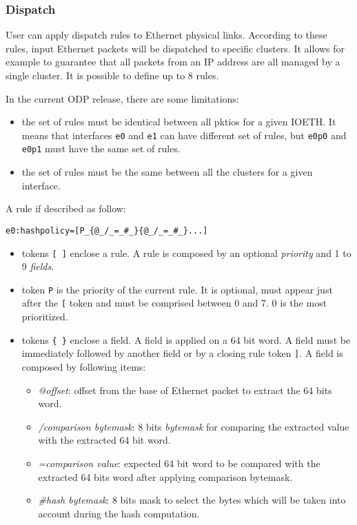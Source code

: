 \documentclass{trkalray}
\begin{document}
\subsubsection{Dispatch}

User can apply dispatch rules to Ethernet physical links. According to
these rules, input Ethernet packets will be dispatched to specific
clusters. It allows for example to guarantee that all packets from an IP
address are all managed by a single cluster. It is possible to define up
to 8 rules.

In the current ODP release, there are some limitations:
\begin{itemize}
	\item the set of rules must be identical between all pktios for a
		given IOETH. It means that interfaces \texttt{e0} and
		\texttt{e1} can have different set of rules, but \texttt{e0p0}
		and \texttt{e0p1} must have the same set of rules.
	\item the set of rules must be the same between all the clusters for
		a given interface.
\end{itemize}

A rule if described as follow:
\begin{lstlisting}
e0:hashpolicy=[P_{@_/_=_#_}{@_/_=_#_}...]
\end{lstlisting}
\begin{itemize}
	\item tokens \texttt{[ ]} enclose a rule. A rule is composed by an
		optional \emph{priority} and 1 to 9 \emph{fields}.
	\item token \texttt{P} is the priority of the current rule. It is
		optional, must appear just after the \texttt{[} token and must
		be comprised between 0 and 7. 0 is the most prioritized.
	\item tokens \texttt{\{ \}} enclose a field. A field is
		applied on a 64 bit word. A field must be immediately
		followed by another field or by a closing rule token
		\texttt{]}. A field is composed by following items:
		\begin{itemize}
			\item \emph{@offset}: offset from the base of Ethernet packet
				to extract the 64 bits word.
			\item \emph{/comparison bytemask}: 8 bits \emph{bytemask} for
				comparing the extracted value with the extracted 64 bit
				word.
			\item \emph{=comparison value}: expected 64 bit word to be
				compared with the extracted 64 bits word after applying
				comparison bytemask.
			\item \emph{\#hash bytemask}: 8 bits mask to select the bytes
				which will be taken into account during the hash
				computation.
		\end{itemize}
\end{itemize}
\end{document}
